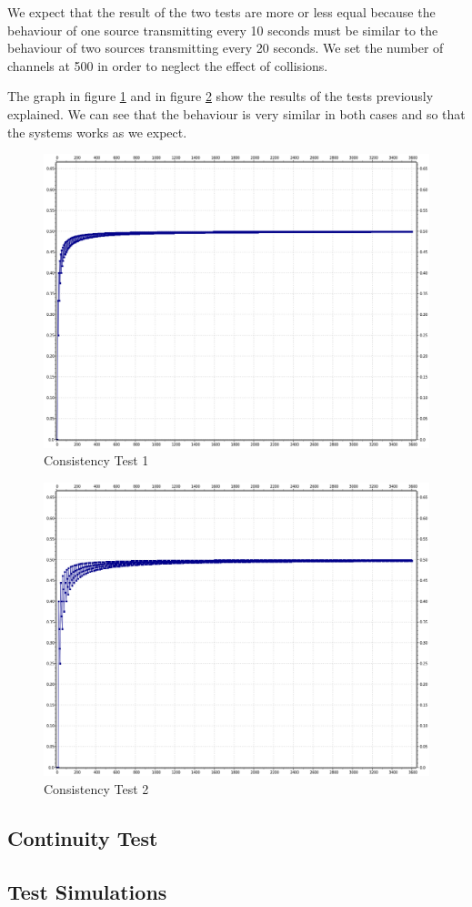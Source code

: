 \noindent We expect that the result of the two tests are more or less equal because the behaviour of one source transmitting every 10 seconds must be similar to the behaviour of two sources transmitting every 20 seconds. We set the number of channels at 500 in order to neglect the effect of collisions.

\noindent The graph in figure \ref{img: consistencyTest1a} and in figure \ref{img: consistencyTest1b} show the results of the tests previously explained. We can see that the behaviour is very similar in both cases and so that the systems works as we expect.

\begin{figure}[htpb]
	\centering
	\includegraphics[scale=0.32]{img/ConsistencyTest1a.png}
	\caption{Consistency Test 1}
	\label {img: consistencyTest1a}
\end{figure}
\newpage
\begin{figure}[htpb]
	\centering
	\includegraphics[scale=0.32]{img/ConsistencyTest1b.png}
	\caption{Consistency Test 2}
	\label {img: consistencyTest1b}
\end{figure}

\subsection{Continuity Test}


\subsection{Test Simulations}
